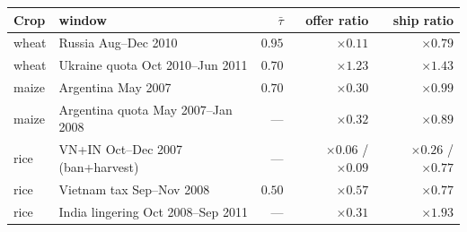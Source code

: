 \begin{tabular}{ll rrr}
\toprule
Crop & window & $\bar\tau$ & offer ratio & ship ratio \\
\midrule
wheat & Russia Aug--Dec 2010 & $0.95$ & $\times 0.11$ & $\times 0.79$ \\
wheat & Ukraine quota Oct 2010--Jun 2011 & $0.70$ & $\times 1.23$ & $\times 1.43$ \\
maize & Argentina May 2007 & $0.70$ & $\times 0.30$ & $\times 0.99$ \\
maize & Argentina quota May 2007--Jan 2008 & --- & $\times 0.32$ & $\times 0.89$ \\
rice  & VN+IN Oct--Dec 2007 (ban+harvest) & --- & $\times 0.06$ / $\times 0.09$ & $\times 0.26$ / $\times 0.77$ \\
rice  & Vietnam tax Sep--Nov 2008 & $0.50$ & $\times 0.57$ & $\times 0.77$ \\
rice  & India lingering Oct 2008--Sep 2011 & --- & $\times 0.31$ & $\times 1.93$ \\
\bottomrule
\end{tabular}
